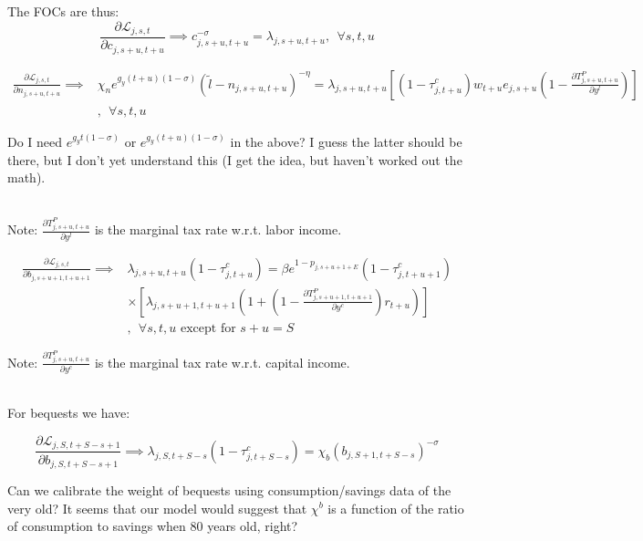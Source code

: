 \documentclass[article,11pt,letterpaper,fleqn]{article}
\theoremstyle{definition}
\numberwithin{equation}{section}
\begin{document}
The FOCs are thus:
\begin{equation}
\label{eqn:foc_c}
\frac{\partial \mathcal{L}_{j,s,t}}{\partial c_{j,s+u,t+u}} \implies c_{j,s+u,t+u}^{-\sigma} = \lambda_{j,s+u,t+u} , \ \ \forall s,t,u
\end{equation}

\begin{equation}
\label{eqn:foc_n}
\begin{split}
\frac{\partial \mathcal{L}_{j,s,t}}{\partial n_{j,s+u,t+u}} \implies &  \chi_{n}e^{g_{y}(t+u)(1-\sigma)}(\tilde{l}-n_{j,s+u,t+u})^{-\eta}= \lambda_{j,s+u,t+u}\left[(1-\tau^{c}_{j,t+u})w_{t+u}e_{j,s+u}\left(1-\frac{\partial T^{P}_{j,s+u,t+u}}{\partial y^{l}}\right)\right]  \\
&  , \ \ \forall s,t,u
\end{split}
\end{equation}

Do I need $e^{g_{y}t(1-\sigma)}$ or $e^{g_{y}(t+u)(1-\sigma)}$ in the above?  I guess the latter should be there, but I don't yet understand this (I get the idea, but haven't worked out the math).

\ \\

Note: $\frac{\partial T^{P}_{j,s+u,t+u}}{\partial y^{l}}$ is the marginal tax rate w.r.t. labor income.

\begin{equation}
\label{eqn:foc_b}
\begin{split}
\frac{\partial \mathcal{L}_{j,s,t}}{\partial b_{j,s+u+1,t+u+1}} \implies &  \lambda_{j,s+u,t+u}(1-\tau^{c}_{j,t+u}) =  
\beta e^{1-p_{j,s+u+1+E}}(1-\tau^{c}_{j,t+u+1}) \\
& \times \left[\lambda_{j,s+u+1,t+u+1}\left(1+\left(1-\frac{\partial T^{P}_{j,s+u+1,t+u+1}}{\partial y^{c}}\right)r_{t+u}\right)\right]   \\
& , \ \ \forall s,t,u \text{ except for } s+u=S
\end{split}
\end{equation}

Note: $\frac{\partial T^{P}_{j,s+u,t+u}}{\partial y^{c}}$ is the marginal tax rate w.r.t. capital income.

\ \\

For bequests we have:

\begin{equation}
\label{eqn:foc_b_final}
\frac{\partial \mathcal{L}_{j,S,t+S-s+1}}{\partial b_{j,S,t+S-s+1}} \implies  \lambda_{j,S,t+S-s}(1-\tau^{c}_{j,t+S-s}) = \chi_{b} (b_{j,S+1,t+S-s})^{-\sigma} 
\end{equation}

Can we calibrate the weight of bequests using consumption/savings data of the very old?  It seems that our model would suggest that $\chi^{b}$ is a function of the ratio of consumption to savings when 80 years old, right?
\end{document}
